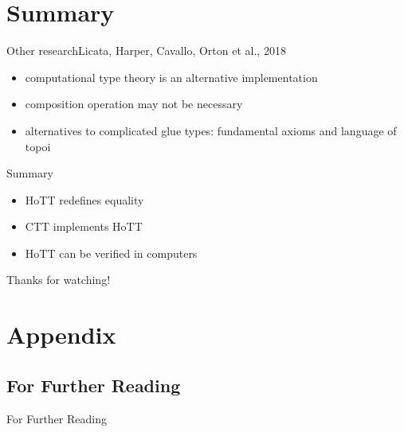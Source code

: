 \documentclass[english,draft]{beamer}
\begin{document}
\section*{Summary}


\begin{frame}{Other research}{Licata, Harper, Cavallo, Orton et al., 2018}
    \begin{itemize}
        \item computational type theory is an alternative implementation 
        \item composition operation may not be necessary
        \item alternatives to complicated glue types: fundamental axioms and language of topoi
    \end{itemize}
\end{frame}


\begin{frame}{Summary}

    \begin{itemize}
        \item HoTT redefines equality
        \item CTT implements HoTT
        \item HoTT can be verified in computers 
    \end{itemize}

Thanks for watching!

\end{frame}

\appendix

\section*{Appendix}

\subsection*{For Further Reading}
\begin{frame}[allowframebreaks]{For Further Reading}



\end{frame}
\end{document}
